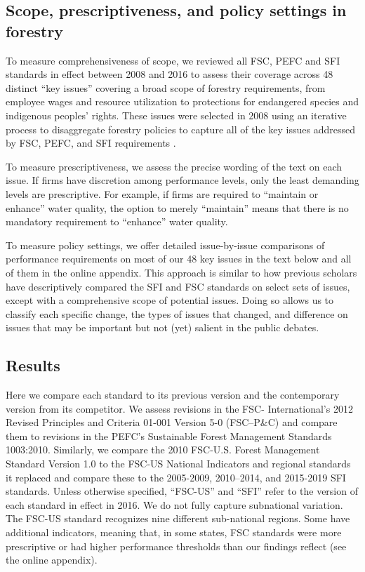 \documentclass[
      12pt,
            Review ]{article}
\begin{document}
\subsection{Scope, prescriptiveness, and policy settings in
forestry}\label{scope-prescriptiveness-and-policy-settings-in-forestry}

To measure comprehensiveness of scope, we reviewed all FSC, PEFC and SFI
standards in effect between 2008 and 2016 to assess their coverage
across 48 distinct ``key issues'' covering a broad scope of forestry
requirements, from employee wages and resource utilization to
protections for endangered species and indigenous peoples' rights. These
issues were selected in 2008 using an iterative process to disaggregate
forestry policies to capture all of the key issues addressed by FSC,
PEFC, and SFI requirements \citep{McDermott2010}.

To measure prescriptiveness, we assess the precise wording of the text
on each issue. If firms have discretion among performance levels, only
the least demanding levels are prescriptive. For example, if firms are
required to ``maintain or enhance'' water quality, the option to merely
``maintain'' means that there is no mandatory requirement to ``enhance''
water quality.

To measure policy settings, we offer detailed issue-by-issue comparisons
of performance requirements on most of our 48 key issues in the text
below and all of them in the online appendix. This approach is similar
to how previous scholars have descriptively compared the SFI and FSC
standards on select sets of issues, except with a comprehensive scope of
potential issues. Doing so allows us to classify each specific change,
the types of issues that changed, and difference on issues that may be
important but not (yet) salient in the public debates.

\subsection{Results}\label{results}

Here we compare each standard to its previous version and the
contemporary version from its competitor. We assess revisions in the
FSC- International's 2012 Revised Principles and Criteria 01-001 Version
5-0 (FSC--P\&C) and compare them to revisions in the PEFC's Sustainable
Forest Management Standards 1003:2010. Similarly, we compare the 2010
FSC-U.S. Forest Management Standard Version 1.0 to the FSC-US National
Indicators and regional standards it replaced and compare these to the
2005-2009, 2010--2014, and 2015-2019 SFI standards. Unless otherwise
specified, ``FSC-US'' and ``SFI'' refer to the version of each standard
in effect in 2016. We do not fully capture subnational variation. The
FSC-US standard recognizes nine different sub-national regions. Some
have additional indicators, meaning that, in some states, FSC standards
were more prescriptive or had higher performance thresholds than our
findings reflect (see the online appendix).
\end{document}
